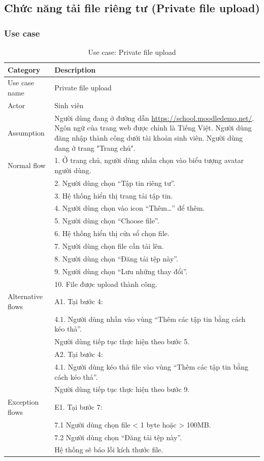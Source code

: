 \subsection{Chức năng tải file riêng tư (Private file upload)}
\subsubsection{Use case}

\begin{table}[H]
    \centering
    \begin{tabular}{|l|p{11cm}|}
        \hline
        Category & Description \\
        \hline
        Use case name & Private file upload \\
        \hline
        Actor & Sinh viên \\
        \hline
        Assumption & Người dùng đang ở đường dẫn \url{https://school.moodledemo.net/}. Ngôn ngữ của trang web được chỉnh là Tiếng Việt. Người dùng đăng nhập thành công dưới tài khoản sinh viên. Người dùng đang ở trang "Trang chủ".\\\hline
        Normal flow & 
        1. Ở trang chủ, người dùng nhấn chọn vào biểu tượng avatar người dùng. \\
        & 2. Người dùng chọn “Tập tin riêng tư”. \\
        & 3. Hệ thống hiển thị trang tải tập tin.\\
        & 4. Người dùng chọn vào icon “Thêm…” để thêm.\\
        & 5. Người dùng chọn “Choose file”.\\
        & 6. Hệ thống hiển thị cửa sổ chọn file.\\
        & 7. Người dùng chọn file cần tải lên.\\
        & 8. Người dùng chọn “Đăng tải tệp này”.\\
        & 9. Người dùng chọn “Lưu những thay đổi”.\\
        & 10. File được upload thành công.\\\hline
        Alternative flows &
        A1. Tại bước 4:\\
        & 4.1. Người dùng nhấn vào vùng “Thêm các tập tin bằng cách kéo thả”.\\
        & Người dùng tiếp tục thực hiện theo bước 5.\\
        & A2. Tại bước 4:\\
        & 4.1. Người dùng kéo thả file vào vùng “Thêm các tập tin bằng cách kéo thả”.\\
        & Người dùng tiếp tục thực hiện theo bước 9.
        \\\hline
        Exception flows &
        E1. Tại bước 7:\\
        & 7.1 Người dùng chọn file < 1 byte hoặc > 100MB.\\
        & 7.2 Người dùng chọn “Đăng tải tệp này”.\\
        & Hệ thống sẽ báo lỗi kích thước file.\\\hline
    \end{tabular}
    \caption{Use case: Private file upload}
    \label{tab:private-file-upload}
\end{table}

